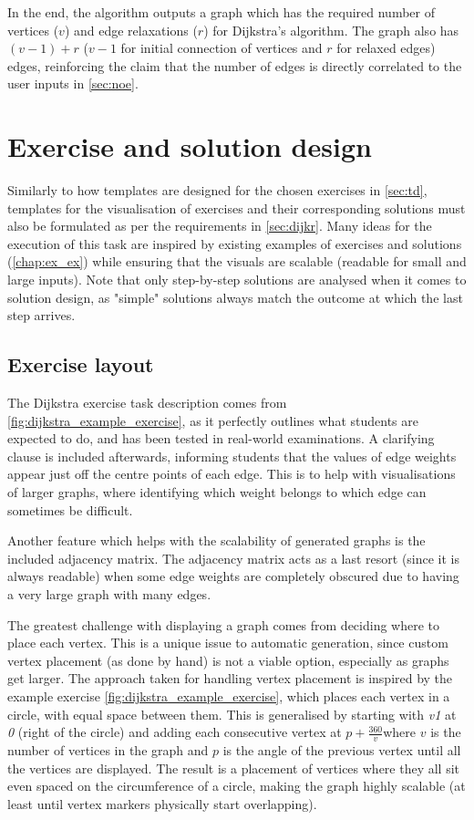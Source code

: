\documentclass{l4proj}
\begin{document}
In the end, the algorithm outputs a graph which has the required number of vertices ($v$) and edge relaxations ($r$) for Dijkstra's algorithm. The graph also has $(v-1) + r$ ($v-1$ for initial connection of vertices and $r$ for relaxed edges) edges, reinforcing the claim that the number of edges is directly correlated to the user inputs in \autoref{sec:noe}.

\section{Exercise and solution design}


Similarly to how templates are designed for the chosen exercises in \autoref{sec:td}, templates for the visualisation of exercises and their corresponding solutions must also be formulated as per the requirements in \autoref{sec:dijkr}. Many ideas for the execution of this task are inspired by existing examples of exercises and solutions (\autoref{chap:ex_ex}) while ensuring that the visuals are scalable (readable for small and large inputs). Note that only step-by-step solutions are analysed when it comes to solution design, as "simple" solutions always match the outcome at which the last step arrives.

\subsection{Exercise layout}
\label{sec:dijkstraExerciseDesign}

The Dijkstra exercise task description comes from \autoref{fig:dijkstra_example_exercise}, as it perfectly outlines what students are expected to do, and has been tested in real-world examinations. A clarifying clause is included afterwards, informing students that the values of edge weights appear just off the centre points of each edge. This is to help with visualisations of larger graphs, where identifying which weight belongs to which edge can sometimes be difficult.

Another feature which helps with the scalability of generated graphs is the included adjacency matrix. The adjacency matrix acts as a last resort (since it is always readable) when some edge weights are completely obscured due to having a very large graph with many edges. 

The greatest challenge with displaying a graph comes from deciding where to place each vertex. This is a unique issue to automatic generation, since custom vertex placement (as done by hand) is not a viable option, especially as graphs get larger. The approach taken for handling vertex placement is inspired by the example exercise  \autoref{fig:dijkstra_example_exercise}, which places each vertex in a circle, with equal space between them. This is generalised by starting with \emph{v1} at \emph{0 \textdegree} (right of the circle) and adding each consecutive vertex at $p+\frac{360 }{v}$\textdegree where $v$ is the number of vertices in the graph and $p$ is the angle of the previous vertex until all the vertices are displayed. The result is a placement of vertices where they all sit even spaced on the circumference of a circle, making the graph highly scalable (at least until vertex markers physically start overlapping).
\end{document}
